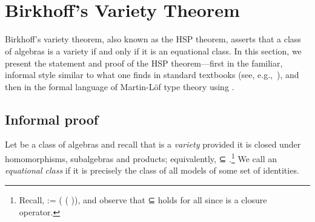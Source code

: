 \begin{code}%
\>[0]\<%
\\
%
\>[1]\AgdaSpace{}%
\AgdaSymbol{:}\AgdaSpace{}%
\AgdaSpace{}%
\AgdaSpace{}%
\AgdaSpace{}%
\AgdaSymbol{(}\AgdaSpace{}%
\AgdaSymbol{(}\AgdaSpace{}%
\AgdaSpace{}%
\AgdaSpace{}%
\AgdaSymbol{))}\AgdaSpace{}%
\AgdaSpace{}%
\AgdaSpace{}%
\AgdaOperator{\AgdaFunction{𝔽[}}\AgdaSpace{}%
\AgdaSpace{}%
\AgdaOperator{\AgdaFunction{]}}\AgdaSpace{}%
\AgdaSymbol{(}\AgdaSpace{}%
\AgdaSpace{}%
\AgdaSpace{}%
\AgdaSymbol{)}\<%
\\
%
\>[1]\AgdaSpace{}%
\AgdaSpace{}%
\AgdaSymbol{=}\AgdaSpace{}%
\AgdaSpace{}%
\AgdaSymbol{(}\AgdaSpace{}%
\AgdaSpace{}%
\AgdaSymbol{\{}\AgdaSpace{}%
\AgdaSymbol{\}}\AgdaSpace{}%
\AgdaSpace{}%
\AgdaSymbol{\{}\AgdaSpace{}%
\AgdaSymbol{=}\AgdaSpace{}%
\AgdaSymbol{\}\{}\AgdaSymbol{\}))}\AgdaSpace{}%
\<%
\end{code}
\fi



\section{Birkhoff's Variety Theorem}

Birkhoff's variety theorem, also known as the HSP theorem, asserts that a class of algebras
is a variety if and only if it is an equational class.  In this section, we present the
statement and proof of the HSP theorem---first in the familiar, informal style similar to
what one finds in standard textbooks (see, e.g.,~\cite[Theorem 4.41]{Bergman:2012}),
and then in the formal language of Martin-Löf type theory using \agda.

\subsection{Informal proof}
Let  be a class of algebras and recall that  is a \emph{variety} provided
\ifshort\else
it is closed under homomorphisms, subalgebras and products; equivalently,
\fi
{}  ⊆ .\footnote{Recall,   :=  ( ( )),
and observe that  ⊆   holds for all  since
 is a closure operator.}
We call  an \emph{equational class} if it is precisely the class of all models of some set of identities.

